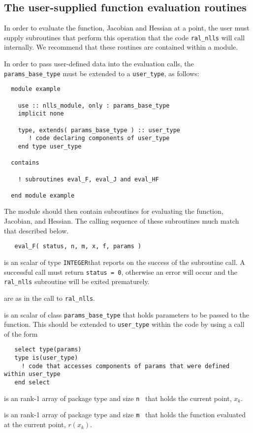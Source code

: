 \documentclass{hslspec}
\newcommand{\scalarintegerio}{is an \intentout scalar of type {\tt INTEGER}}
\newcommand{\ronearrayrealii}[1]{is an \intentin rank-1 array of package type and size {\tt #1}\ }
\newcommand{\ronearrayrealio}[1]{is an \intentout rank-1 array of package type and size {\tt #1}\ }
\begin{document}
\subsection{The user-supplied function evaluation routines}
\label{sec::function_eval}
In order to evaluate the function, Jacobian and Hessian at a point, the user must supply
subroutines that perform this operation that the code {\tt ral\_nlls} will call internally.  
We recommend that these routines are contained within a module.

In order to pass user-defined data into the evaluation calls, the {\tt params\_base\_type} must be extended to a {\tt user\_type}, as follows:
\begin{verbatim}
  module example

    use :: nlls_module, only : params_base_type
    implicit none

    type, extends( params_base_type ) :: user_type
       ! code declaring components of user_type 
    end type user_type
  
  contains 

    ! subroutines eval_F, eval_J and eval_HF

  end module example
\end{verbatim}
The module should then contain subroutines for evaluating the function, Jacobian, and Hessian.
The calling sequence of these subroutines much match that described below.

\begin{verbatim}
   eval_F( status, n, m, x, f, params )
\end{verbatim}

\begin{description}
   \scalarintegerio that reports on the success of the subroutine call.  A successful call must return {\tt status = 0}, otherwise an error will occur and the {\tt ral\_nlls} subroutine will be exited prematurely.

   are as in the call to {\tt ral\_nlls}.

   is an \intentin scalar of class {\tt params\_base\_type} that holds parameters to be passed to the function.  This should be extended to {\tt user\_type} within the code by using a call of the form
\begin{verbatim}
   select type(params)
   type is(user_type)
     ! code that accesses components of params that were defined within user_type 
   end select
\end{verbatim}

   \ronearrayrealii{n} that holds the current point, $x_k$.
  
   \ronearrayrealio{m} that holds the function evaluated at the current point, $r(x_k)$.
  
\end{description}
\end{document}
